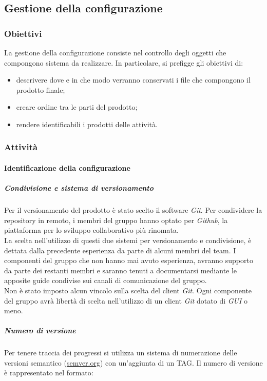 \subsection{Gestione della configurazione}
\subsubsection{Obiettivi}
La gestione della configurazione consiste nel controllo degli oggetti che compongono sistema da realizzare. In particolare, si prefigge gli obiettivi di:
\begin{itemize}
	\item descrivere dove e in che modo verranno conservati i file che compongono il prodotto finale;
	\item creare ordine tra le parti del prodotto;
	\item rendere identificabili i prodotti delle attività.
\end{itemize}

\subsubsection{Attività}
\paragraph{Identificazione della configurazione}
\subparagraph*{Condivisione e sistema di versionamento\glo}
Per il versionamento del prodotto è stato scelto il software \textit{Git\glos}. Per condividere la repository in remoto, i membri del gruppo hanno optato per \textit{Github\glos}, la piattaforma per lo sviluppo collaborativo più rinomata. \\

\noindent La scelta nell'utilizzo di questi due sistemi per versionamento e condivisione, è dettata dalla precedente esperienza da parte di alcuni membri del team. I componenti del gruppo che non hanno mai avuto esperienza, avranno supporto da parte dei restanti membri e saranno tenuti a documentarsi mediante le apposite guide condivise sui canali di comunicazione del gruppo. \\

\noindent Non è stato imposto alcun vincolo sulla scelta del client \textit{Git\glos}. Ogni componente del gruppo avrà libertà di scelta nell'utilizzo di un client \textit{Git\glo} dotato di \textit{GUI\glo} o meno.

\subparagraph*{Numero di versione}
Per tenere traccia dei progressi si utilizza un sistema di numerazione delle versioni
semantico (\href{https://semver.org/lang/it/}{semver.org}) con un'aggiunta di un TAG.
Il numero di versione è rappresentato nel formato:\\\\

